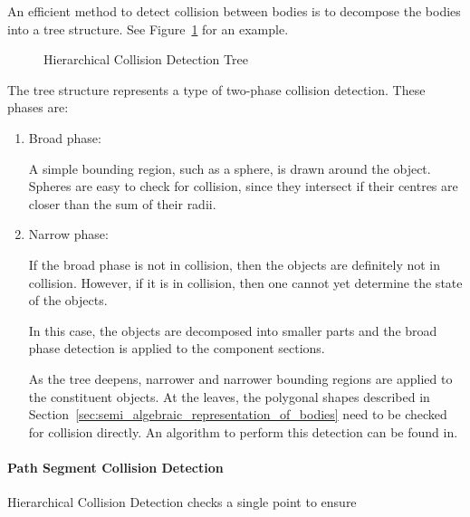 				An efficient method to detect collision between bodies is to
				decompose the bodies into a tree structure. See
				Figure~\ref{fig:hierarchical_collision_detection_tree} for an
				example.

				\begin{figure}[hb]
					\caption{Hierarchical Collision Detection Tree}%
					\label{fig:hierarchical_collision_detection_tree}
				\end{figure}

				The tree structure represents a type of two-phase collision
				detection. These phases are:

				\begin{enumerate}

					\item Broad phase:

						A simple bounding region, such as a sphere, is drawn
						around the object. Spheres are easy to check for
						collision, since they intersect if their centres are
						closer than the sum of their radii.

					\item Narrow phase:

						If the broad phase is not in collision, then the objects
						are definitely not in collision. However, if it is in
						collision, then one cannot yet determine the state of
						the objects.

						In this case, the objects are decomposed into smaller
						parts and the broad phase detection is applied to the
						component sections.

						As the tree deepens, narrower and narrower bounding
						regions are applied to the constituent objects. At the
						leaves, the polygonal shapes described in
						Section~\ref{sec:semi_algebraic_representation_of_bodies}
						need to be checked for collision directly. An algorithm
						to perform this detection can be found in.

				\end{enumerate}

			\paragraph{Path Segment Collision Detection}%
			\label{sec:path_segment_collision_detection}

				Hierarchical Collision Detection checks a single point to ensure

